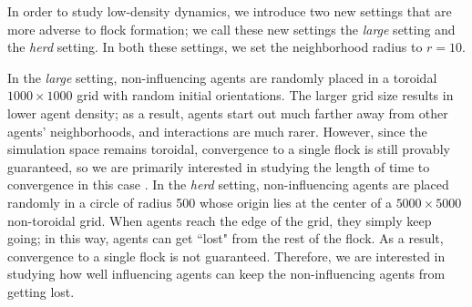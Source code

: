 In order to study low-density dynamics, we introduce two new settings that are
more adverse to flock formation; we call these new settings the \textit{large}
setting and the \textit{herd} setting.
In both these settings, we set the neighborhood radius to $r=10$.

In the \textit{large} setting, non-influencing agents are randomly placed in a
toroidal $1000\times1000$ grid with random initial orientations.
The larger grid size results in lower agent density; as a result, agents start
out much farther away from other agents' neighborhoods, and interactions are
much rarer.
However, since the simulation space remains toroidal, convergence to a single
flock is still provably guaranteed, so we are primarily interested in
studying the length of time to convergence in this case
\cite{jad2003convergence}.
In the \textit{herd} setting, non-influencing agents are placed randomly in a
circle of radius 500 whose origin lies at the center of a $5000\times5000$
non-toroidal grid.
When agents reach the edge of the grid, they simply keep going; in this way,
agents can get ``lost" from the rest of the flock.
As a result, convergence to a single flock is not guaranteed.
Therefore, we are interested in studying how well influencing agents can keep
the non-influencing agents from getting lost.
